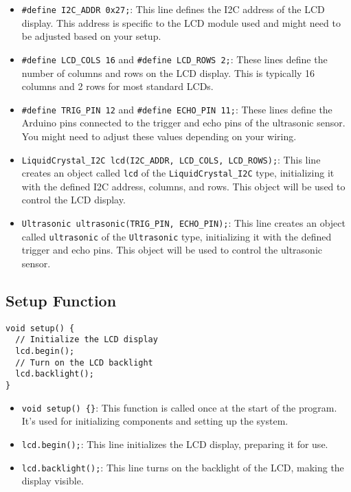 \documentclass{article}
\begin{document}
\begin{itemize}
    \item \texttt{\#define I2C\_ADDR 0x27;}: This line defines the I2C address of the LCD display. This address is specific to the LCD module used and might need to be adjusted based on your setup.
    \item \texttt{\#define LCD\_COLS 16} and \texttt{\#define LCD\_ROWS 2;}: These lines define the number of columns and rows on the LCD display. This is typically 16 columns and 2 rows for most standard LCDs.
    \item \texttt{\#define TRIG\_PIN 12} and \texttt{\#define ECHO\_PIN 11;}: These lines define the Arduino pins connected to the trigger and echo pins of the ultrasonic sensor. You might need to adjust these values depending on your wiring.
    \item \texttt{LiquidCrystal\_I2C lcd(I2C\_ADDR, LCD\_COLS, LCD\_ROWS);}: This line creates an object called \texttt{lcd} of the \texttt{LiquidCrystal\_I2C} type, initializing it with the defined I2C address, columns, and rows. This object will be used to control the LCD display.
    \item \texttt{Ultrasonic ultrasonic(TRIG\_PIN, ECHO\_PIN);}: This line creates an object called \texttt{ultrasonic} of the \texttt{Ultrasonic} type, initializing it with the defined trigger and echo pins. This object will be used to control the ultrasonic sensor.
\end{itemize}

\subsection{Setup Function}

\begin{verbatim}
void setup() {
  // Initialize the LCD display
  lcd.begin();
  // Turn on the LCD backlight
  lcd.backlight();
}
\end{verbatim}

\begin{itemize}
    \item \texttt{void setup() \{\}}: This function is called once at the start of the program. It's used for initializing components and setting up the system.
    \item \texttt{lcd.begin();}: This line initializes the LCD display, preparing it for use.
    \item \texttt{lcd.backlight();}: This line turns on the backlight of the LCD, making the display visible.
\end{itemize}
\end{document}
